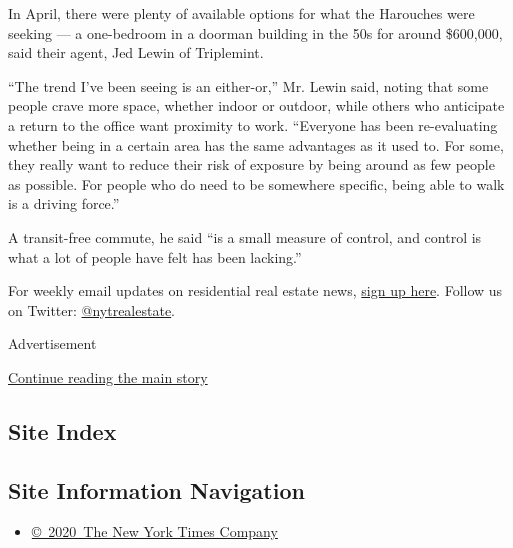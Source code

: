 In April, there were plenty of available options for what the Harouches
were seeking --- a one-bedroom in a doorman building in the 50s for
around \$600,000, said their agent, Jed Lewin of Triplemint.

``The trend I've been seeing is an either-or,'' Mr. Lewin said, noting
that some people crave more space, whether indoor or outdoor, while
others who anticipate a return to the office want proximity to work.
``Everyone has been re-evaluating whether being in a certain area has
the same advantages as it used to. For some, they really want to reduce
their risk of exposure by being around as few people as possible. For
people who do need to be somewhere specific, being able to walk is a
driving force.''

A transit-free commute, he said ``is a small measure of control, and
control is what a lot of people have felt has been lacking.''

For weekly email updates on residential real estate news,
\href{http://www.nytimes3xbfgragh.onion/newsletters/realestate/}{sign up
here}. Follow us on Twitter:
\href{https://twitter.com/nytrealestate}{@nytrealestate}.

Advertisement

\protect\hyperlink{after-bottom}{Continue reading the main story}

\hypertarget{site-index}{%
\subsection{Site Index}\label{site-index}}

\hypertarget{site-information-navigation}{%
\subsection{Site Information
Navigation}\label{site-information-navigation}}

\begin{itemize}
\tightlist
\item
  \href{https://help.nytimes3xbfgragh.onion/hc/en-us/articles/115014792127-Copyright-notice}{©~2020~The
  New York Times Company}
\end{itemize}

